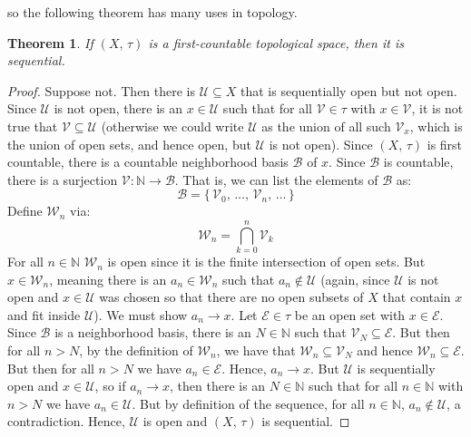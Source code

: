 \documentclass{article}
\theoremstyle{plain}
\newtheorem{theorem}{Theorem}[section]
\theoremstyle{normal}
\begin{document}
        so the following theorem has many uses in topology.
        \begin{theorem}
            If $(X,\,\tau)$ is a first-countable topological space, then it is
            sequential.
        \end{theorem}
        \begin{proof}
            Suppose not. Then there is $\mathcal{U}\subseteq{X}$ that is
            sequentially open but not open. Since $\mathcal{U}$ is not open,
            there is an $x\in\mathcal{U}$ such that for all $\mathcal{V}\in\tau$
            with $x\in\mathcal{V}$, it is not true that
            $\mathcal{V}\subseteq\mathcal{U}$ (otherwise we could write
            $\mathcal{U}$ as the union of all such $\mathcal{V}_{x}$, which is
            the union of open sets, and hence open, but $\mathcal{U}$ is not
            open). Since $(X,\,\tau)$ is first countable, there is a countable
            neighborhood basis $\mathcal{B}$ of $x$. Since $\mathcal{B}$ is
            countable, there is a surjection
            $\mathcal{V}:\mathbb{N}\rightarrow\mathcal{B}$. That is, we can
            list the elements of $\mathcal{B}$ as:
            \begin{equation}
                \mathcal{B}=
                \{\,\mathcal{V}_{0},\,\dots,\,\mathcal{V}_{n},\,\dots\,\}
            \end{equation}
            Define $\mathcal{W}_{n}$ via:
            \begin{equation}
                \mathcal{W}_{n}=\bigcap_{k=0}^{n}\mathcal{V}_{k}
            \end{equation}
            For all $n\in\mathbb{N}$ $\mathcal{W}_{n}$ is open since it is
            the finite intersection of open sets. But $x\in\mathcal{W}_{n}$,
            meaning there is an $a_{n}\in\mathcal{W}_{n}$ such that
            $a_{n}\notin\mathcal{U}$ (again, since $\mathcal{U}$ is not open
            and $x\in\mathcal{U}$ was chosen so that there are no open subsets
            of $X$ that contain $x$ and fit inside $\mathcal{U}$). We must
            show $a_{n}\rightarrow{x}$. Let
            $\mathcal{E}\in\tau$ be an open set with $x\in\mathcal{E}$. Since
            $\mathcal{B}$ is a neighborhood basis, there is an
            $N\in\mathbb{N}$ such that $\mathcal{V}_{N}\subseteq\mathcal{E}$.
            But then for all $n>N$, by the definition of $\mathcal{W}_{n}$,
            we have that $\mathcal{W}_{n}\subseteq\mathcal{V}_{N}$ and hence
            $\mathcal{W}_{n}\subseteq\mathcal{E}$. But then for all $n>N$ we
            have $a_{n}\in\mathcal{E}$. Hence, $a_{n}\rightarrow{x}$. But
            $\mathcal{U}$ is sequentially open and $x\in\mathcal{U}$, so if
            $a_{n}\rightarrow{x}$, then there is an $N\in\mathbb{N}$ such that
            for all $n\in\mathbb{N}$ with $n>N$ we have $a_{n}\in\mathcal{U}$.
            But by definition of the sequence, for all $n\in\mathbb{N}$,
            $a_{n}\notin\mathcal{U}$, a contradiction. Hence,
            $\mathcal{U}$ is open and $(X,\,\tau)$ is sequential.
        \end{proof}
\end{document}
